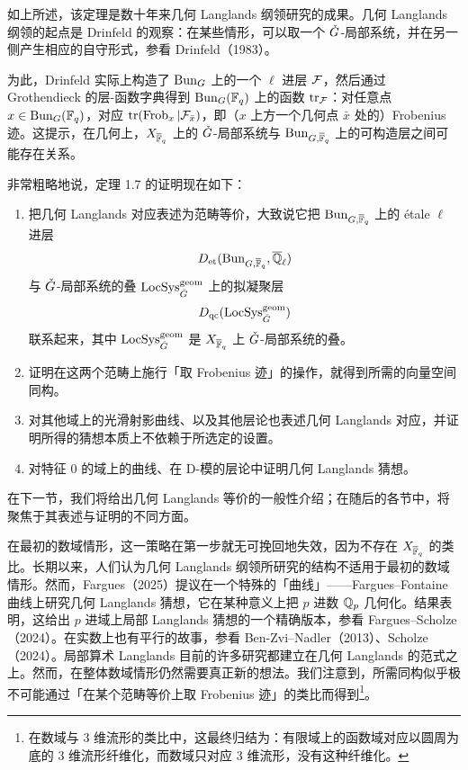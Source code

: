 如上所述，该定理是数十年来几何 Langlands 纲领研究的成果。几何 Langlands 纲领的起点是 Drinfeld 的观察：在某些情形，可以取一个 $\check{G}$-局部系统，并在另一侧产生相应的自守形式，参看 Drinfeld（1983）。

为此，Drinfeld 实际上构造了 $\operatorname{Bun}_G$ 上的一个 $\ell$ 进层 $\mathcal{F}$，然后通过 Grothendieck 的层-函数字典得到 $\operatorname{Bun}_G(\mathbb{F}_{q})$ 上的函数 $\operatorname{tr}_{\mathcal{F}}$：对任意点 $x\in\operatorname{Bun}_G(\mathbb{F}_{q})$，对应 $\operatorname{tr}(\operatorname{Frob}_x|\mathcal{F}_{\bar x})$，即（$x$ 上方一个几何点 $\bar x$ 处的）Frobenius 迹。这提示，在几何上，$X_{\overline{\mathbb{F}}_q}$ 上的 $\check{G}$-局部系统与 $\operatorname{Bun}_{G,\overline{\mathbb{F}}_q}$ 上的可构造层之间可能存在关系。

非常粗略地说，定理 1.7 的证明现在如下：
\begin{enumerate}
\item 把几何 Langlands 对应表述为范畴等价，大致说它把 $\operatorname{Bun}_{G,\overline{\mathbb{F}}_q}$ 上的 étale $\ell$ 进层
\[ D_{\mathrm{et}}(\operatorname{Bun}_{G,\overline{\mathbb{F}}_q},\overline{\mathbb{Q}}_\ell) \]
与 $\check{G}$-局部系统的叠 $\operatorname{LocSys}^{\mathrm{geom}}_{\check{G}}$ 上的拟凝聚层
\[ D_{\mathrm{qc}}(\operatorname{LocSys}^{\mathrm{geom}}_{\check{G}}) \]
联系起来，其中 $\operatorname{LocSys}^{\mathrm{geom}}_{\check{G}}$ 是 $X_{\overline{\mathbb{F}}_q}$ 上 $\check{G}$-局部系统的叠。
\item 证明在这两个范畴上施行「取 Frobenius 迹」的操作，就得到所需的向量空间同构。
\item 对其他域上的光滑射影曲线、以及其他层论也表述几何 Langlands 对应，并证明所得的猜想本质上不依赖于所选定的设置。
\item 对特征 $0$ 的域上的曲线、在 D-模的层论中证明几何 Langlands 猜想。
\end{enumerate}
在下一节，我们将给出几何 Langlands 等价的一般性介绍；在随后的各节中，将聚焦于其表述与证明的不同方面。

\begin{remark}
在最初的数域情形，这一策略在第一步就无可挽回地失效，因为不存在 $X_{\overline{\mathbb{F}}_q}$ 的类比。长期以来，人们认为几何 Langlands 纲领所研究的结构不适用于最初的数域情形。然而，Fargues（2025）提议在一个特殊的「曲线」——Fargues–Fontaine 曲线上研究几何 Langlands 猜想，它在某种意义上把 $p$ 进数 $\mathbb{Q}_p$ 几何化。结果表明，这给出 $p$ 进域上局部 Langlands 猜想的一个精确版本，参看 Fargues–Scholze（2024）。在实数上也有平行的故事，参看 Ben-Zvi–Nadler（2013）、Scholze（2024）。局部算术 Langlands 目前的许多研究都建立在几何 Langlands 的范式之上。然而，在整体数域情形仍然需要真正新的想法。我们注意到，所需同构似乎极不可能通过「在某个范畴等价上取 Frobenius 迹」的类比而得到\footnote{在数域与 3 维流形的类比中，这最终归结为：有限域上的函数域对应以圆周为底的 3 维流形纤维化，而数域只对应 3 维流形，没有这种纤维化。}。
\end{remark}

